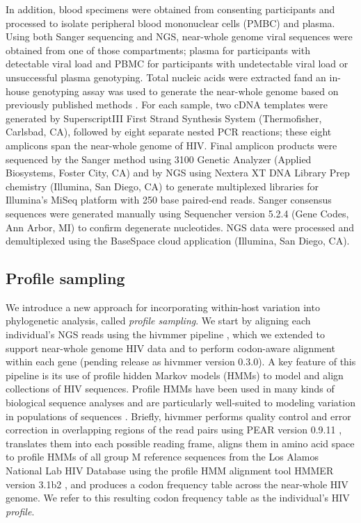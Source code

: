 \documentclass[letterpaper]{article}
\begin{document}
In addition, blood specimens were obtained from consenting participants and processed to isolate peripheral blood mononuclear cells (PMBC) and plasma. Using both Sanger sequencing and NGS, near-whole genome viral sequences were obtained from one of those compartments; plasma for participants with detectable viral load and PBMC for participants with undetectable viral load or unsuccessful plasma genotyping. Total nucleic acids were extracted fand an in-house genotyping assay was used to generate the near-whole genome based on previously published methods \parencite{nadai, di_giallonardo}. For each sample, two cDNA templates were generated by SuperscriptIII First Strand Synthesis System (Thermofisher, Carlsbad, CA), followed by eight separate nested PCR reactions; these eight amplicons span the near-whole genome of HIV. Final amplicon products were sequenced by the Sanger method using 3100 Genetic Analyzer (Applied Biosystems, Foster City, CA) and by NGS using Nextera XT DNA Library Prep chemistry (Illumina, San Diego, CA) to generate multiplexed libraries for Illumina's MiSeq platform with 250 base paired-end reads. Sanger consensus sequences were generated manually using Sequencher version 5.2.4 (Gene Codes, Ann Arbor, MI) to confirm degenerate nucleotides. NGS data were processed and demultiplexed using the BaseSpace cloud application (Illumina, San Diego, CA).

\subsection*{Profile sampling}

We introduce a new approach for incorporating within-host variation into phylogenetic analysis, called \emph{profile sampling}. We start by aligning each individual's NGS reads using the hivmmer pipeline \parencite{howison}, which we extended to support near-whole genome HIV data and to perform codon-aware alignment within each gene (pending release as hivmmer version 0.3.0). A key feature of this pipeline is its use of profile hidden Markov models (HMMs) to model and align collections of HIV sequences. Profile HMMs have been used in many kinds of biological sequence analyses and are particularly well-suited to modeling variation in populations of sequences \parencite{eddy2004}. Briefly, hivmmer performs quality control and error correction in overlapping regions of the read pairs using PEAR version 0.9.11 \parencite{zhang}, translates them into each possible reading frame, aligns them in amino acid space to profile HMMs of all group M reference sequences from the Los Alamos National Lab HIV Database \parencite{losalamos} using the profile HMM alignment tool HMMER version 3.1b2 \parencite{eddy2013}, and produces a codon frequency table across the near-whole HIV genome. We refer to this resulting codon frequency table as the individual's HIV \emph{profile}.
\end{document}
